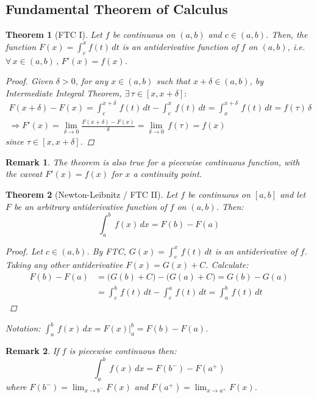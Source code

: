 \documentclass[12pt]{article}
\let\RA\Rightarrow
\newcommand{\Forall}[1]{\forall\,{#1}\,,\,}
\newcommand{\Exist}[1]{\exists\,{#1}:}
\newtheorem{theorem}{Theorem}[subsection]
\newtheorem{remark}{Remark}[subsection]
\begin{document}
\pagebreak

\subsection{Fundamental Theorem of Calculus}

\begin{theorem}[FTC I]
  Let $f$ be continuous on $(a,b)$ and $c\in (a,b)$. Then, the function $\displaystyle F(x)=\int_c^x f(t)\,dt$ is an antiderivative function of $f$ on $(a,b)$, i.e. $\Forall{x\in (a,b)}F'(x)=f(x)$.
  \begin{proof}
    Given $\delta>0$, for any $x\in (a,b)$ such that $x+\delta \in (a,b)$, by Intermediate Integral Theorem, $\Exist{\tau\in[x,x+\delta]}$
    \begin{align*}
      F(x+\delta)-F(x)=\int_c^{x+\delta}\,f(t)\,dt-\int_c^x\,f(t)\,dt=\int_x^{x+\delta}\,f(t)\,dt=f(\tau)\,\delta\\
      \RA F'(x)=\lim_{\delta\to 0}\frac{F(x+\delta)-F(x)}{\delta}=\lim_{\delta\to 0}\,f(\tau)=f(x)
    \end{align*}
    since $\tau\in[x,x+\delta]$.
  \end{proof}
\end{theorem}

\begin{remark}
  The theorem is also true for a piecewise continuous function, with the caveat $F'(x)=f(x)$ for $x$ a continuity point.
\end{remark}

\begin{theorem}[Newton-Leibnitz / FTC II]
  Let $f$ be continuous on $[a,b]$ and let $F$ be an arbitrary antiderivative function of $f$ on $(a,b)$. Then: $$\int_a^b\,f(x)\,dx=F(b)-F(a)$$
  \begin{proof}
    Let $c\in (a,b)$. By FTC, $\displaystyle G(x)=\int_c^x\,f(t)\,dt$ is an antiderivative of $f$. Taking any other antiderivative $F(x)=G(x)+C$. Calculate: 
    \begin{align*}
      F(b)-F(a)&=\big(G(b)+C\big)-\big(G(a)+C\big)=G(b)-G(a)\\&=\int^b_c\,f(t)\,dt-\int_c^a\,f(t)\,dt=\int_a^b\,f(t)\,dt
    \end{align*}
  \end{proof}
  Notation: $\displaystyle \int_a^b\,f(x)\,dx=F(x)\Big|_a^b=F(b)-F(a)$.
\end{theorem}

\begin{remark}
  If $f$ is piecewise continuous then: $$\int_a^b\,f(x)\,dx=F(b^{-})-F(a^{+})$$ where $\displaystyle F(b^{-})=\lim_{x\to b^{-}}F(x)$ and $\displaystyle F(a^{+})=\lim_{x\to a^{+}}F(x)$.
\end{remark}
\end{document}
